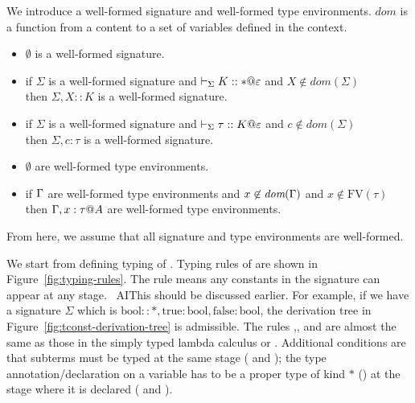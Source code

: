 We introduce a well-formed signature and well-formed type environments.
$\textit{dom}$ is a function from a content to a set of variables defined in the context.
\begin{definition}
	\begin{itemize}
		\item $\emptyset$ is a well-formed signature.
		\item if $\Sigma$ is a well-formed signature and $\vdash_\Sigma K :: * @ \varepsilon$ and $X\notin\textit{dom}(\Sigma)$ \\
		      then $\Sigma,X::K$ is a well-formed signature.
		\item if $\Sigma$ is a well-formed signature and $\vdash_\Sigma \tau :: K @ \varepsilon$ and $c\notin\textit{dom}(\Sigma)$ \\
		      then $\Sigma,c:\tau$ is a well-formed signature.
	\end{itemize}
\end{definition}
\begin{definition}
	\begin{itemize}
		\item $\emptyset$ are well-formed type environments.
		\item if $\Gamma$ are well-formed type environments and $x\not\in\textit{dom}(\Gamma)$ and $x\not\in\textrm{FV}(\tau)$ \\
		      then $\G,x:\tau@A$ are well-formed type environments.
	\end{itemize}
\end{definition}
From here, we assume that all signature and type environments are well-formed.

We start from defining typing of
\LMD.  Typing rules of \LMD are shown in Figure~\ref{fig:typing-rules}.
The rule \TConst{} means any constants in the
signature can appear at any stage.  \
AI{This should be discussed earlier.}
For example, if we have a signature $\Sigma$ which is
$\textrm{bool} :: *, \textrm{true}: \textrm{bool}, \textrm{false}:
	\textrm{bool}$, the derivation tree in
Figure~\ref{fig:tconst-derivation-tree} is admissible.
The rules \TVar,\TAbs, and \TApp{} are almost the same as those in the simply typed
lambda calculus or \LLF.  Additional conditions are that subterms must be
typed at the same stage (\TAbs{} and \TApp); the type
annotation/declaration on a variable has to be a proper type of kind
$*$ (\TAbs) at the stage where it is declared (\TVar{} and \TAbs).

